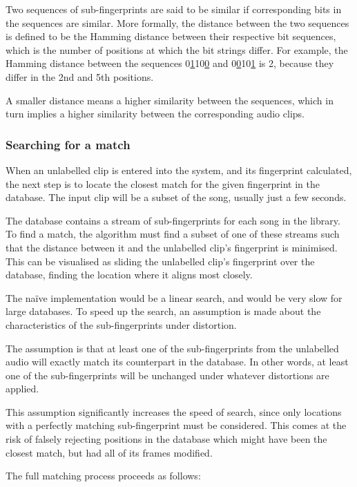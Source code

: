 \documentclass[12pt,a4paper,twoside,openright]{report}
\begin{document}
Two sequences of sub-fingerprints are said to be similar if corresponding bits in the sequences are similar. More formally, the distance between the two sequences is defined to be the Hamming distance between their respective bit sequences, which is the number of positions at which the bit strings differ. For example, the Hamming distance between the sequences 0\underline{1}10\underline{0} and 0\underline{0}10\underline{1} is 2, because they differ in the 2nd and 5th positions. 

A smaller distance means a higher similarity between the sequences, which in turn implies a higher similarity between the corresponding audio clips.


\subsubsection{Searching for a match}

When an unlabelled clip is entered into the system, and its fingerprint calculated, the next step is to locate the closest match for the given fingerprint in the database. The input clip will be a subset of the song, usually just a few seconds.

The database contains a stream of sub-fingerprints for each song in the library. To find a match, the algorithm must find a subset of one of these streams such that the distance between it and the unlabelled clip's fingerprint is minimised. This can be visualised as sliding the unlabelled clip's fingerprint over the database, finding the location where it aligns most closely.

The na\"ive implementation would be a linear search, and would be very slow for large databases. To speed up the search, an assumption is made about the characteristics of the sub-fingerprints under distortion. 

The assumption is that at least one of the sub-fingerprints from the unlabelled audio will exactly match its counterpart in the database. In other words, at least one of the sub-fingerprints will be unchanged under whatever distortions are applied.

This assumption significantly increases the speed of search, since only locations with a perfectly matching sub-fingerprint must be considered. This comes at the risk of falsely rejecting positions in the database which might have been the closest match, but had all of its frames modified.

The full matching process proceeds as follows:
\end{document}

